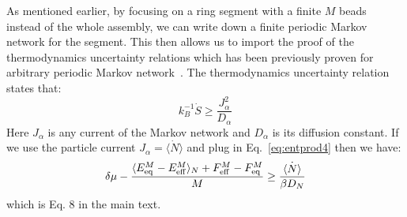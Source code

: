 \documentclass[amsmath,preprintnumbers,10pt,nofootinbib,prl,twocolumn]{revtex4-1}
\begin{document}
As mentioned earlier, by focusing on a ring segment with a finite $M$ beads instead of the whole assembly, we can write down a finite periodic Markov network for the segment. This then allows us to import the proof of the thermodynamics uncertainty relations which has been previously proven for arbitrary periodic Markov network~\cite{Barato2015,Gingrich2016}. The thermodynamics uncertainty relation states that:
\begin{equation}
\label{eq:thermodynamicsuncertaintyrelation}
    k_B^{-1}\dot{S}\geq\frac{J_\alpha^2}{ D_\alpha}
\end{equation}
Here $J_\alpha$ is any current of the Markov network and $D_\alpha$ is its diffusion constant. If we use the particle current $J_\alpha=\dot{\langle N \rangle}$ and plug in Eq.~\ref{eq:entprod4} then we have:
\begin{equation}
\label{eq:equation8maintext}
    \delta \mu -\frac{\langle E^M_{\rm{eq}}-E^M_{\rm{eff}}\rangle_N+F^M_{\rm{eff}}-F^M_{\rm{eq}}}{M}\geq \frac{\dot{\langle N \rangle}}{\beta D_N}
\end{equation}
which is Eq. 8 in the main text.
%
\end{document}
